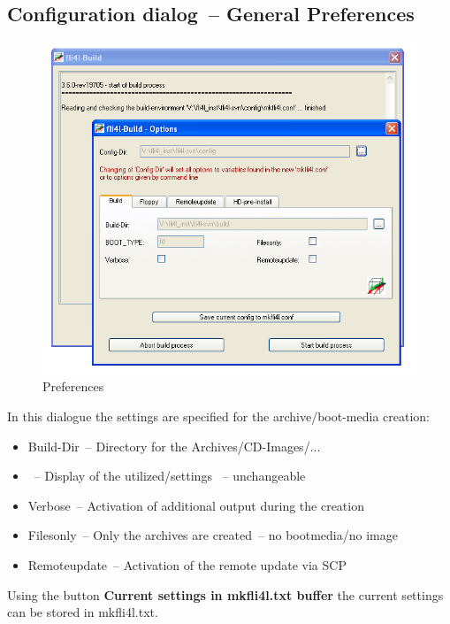   \subsection{Configuration dialog~-- General Preferences}
  \begin{figure}[ht!]
  \centering
  \includegraphics[width=\columnwidth]{win_build_build}
  \caption{Preferences}
  \label{fig:win_build_build}
  \end{figure}

  In this dialogue the settings are specified for the archive/boot-media
  creation:
  \begin{itemize}
    \item Build-Dir~-- Directory for the Archives/CD-Images/...
    \item {}~-- Display of the utilized/settings ~-- unchangeable
    \item Verbose~-- Activation of additional output during the creation
    \item Filesonly~-- Only the archives are created~-- no bootmedia/no image
    \item Remoteupdate~-- Activation of the remote update via SCP
  \end{itemize}

  Using the button \textbf{Current settings in mkfli4l.txt buffer}
  the current settings can be stored in mkfli4l.txt.

